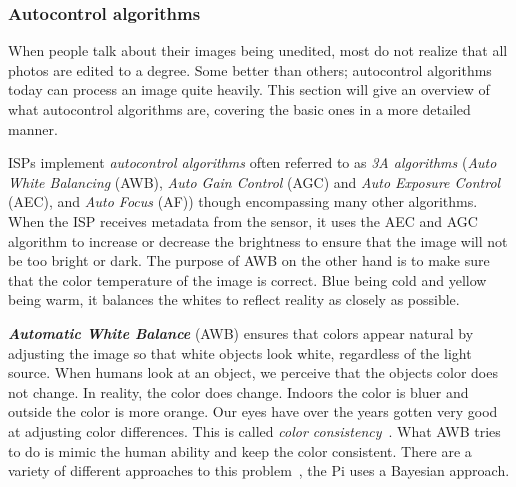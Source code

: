 \subsubsection{Autocontrol algorithms} \label{section:autocontrol}
When people talk about their images being unedited, most do not realize that all
photos are edited to a degree. Some better than others; autocontrol algorithms
today can process an image quite heavily. This section will give an overview of
what autocontrol algorithms are, covering the basic ones in a more detailed
manner.

ISPs implement \textit{autocontrol algorithms} often referred to as \textit{3A algorithms} (\textit{Auto
White Balancing} (AWB), \textit{Auto Gain Control} (AGC) and \textit{Auto
Exposure Control} (AEC), and \textit{Auto Focus} (AF)) though encompassing many
other algorithms. When the ISP receives metadata from the sensor, it uses the
AEC and AGC algorithm to increase or decrease the brightness to ensure that the
image will not be too bright or dark. The purpose of AWB on the other hand is
to make sure that the color temperature of the image is correct. Blue being cold and
yellow being warm, it balances the whites to reflect reality as closely as
possible.

\textit{\textbf{Automatic White Balance}} (AWB) ensures that colors appear
natural by adjusting the image so that white objects look white, regardless of
the light source. When humans look at an object, we perceive that the objects color
does not change. In reality, the color does change. Indoors the color
is bluer and outside the color is more orange. Our eyes have over the years
gotten very good at adjusting color differences. This is called \textit{color
consistency}~\cite{foster2011color, ebner2021color}. What AWB tries to do is
mimic the human ability and keep the color consistent. There are a variety of
different approaches to this problem~\cite{agarwal2006overview}, the Pi uses a
Bayesian approach.

